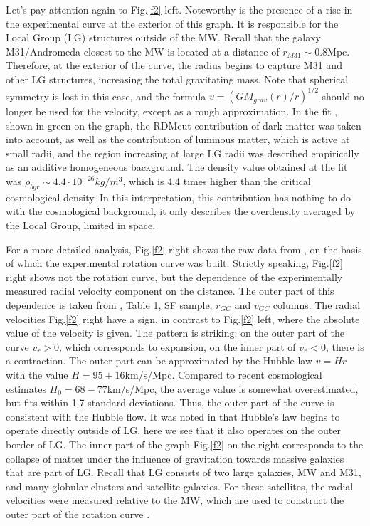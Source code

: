 \documentclass{article}
\begin{document}
Let's pay attention again to Fig.\ref {f2} left. Noteworthy is the presence of a rise in the experimental curve at the exterior of this graph. It is responsible for the Local Group (LG) structures outside of the MW. Recall that the galaxy M31/Andromeda closest to the MW is located at a distance of $ r_ {M31} \sim0.8 $Mpc. Therefore, at the exterior of the curve, the radius begins to capture M31 and other LG structures, increasing the total gravitating mass. Note that spherical symmetry is lost in this case, and the formula $ v = (GM_ {grav} (r) / r) ^ {1/2} $ should no longer be used for the velocity, except as a rough approximation. In the fit \cite {bled2020}, shown in green on the graph, the RDMcut contribution of dark matter was taken into account, as well as the contribution of luminous matter, which is active at small radii, and the region increasing at large LG radii was described empirically as an additive homogeneous background. The density value obtained at the fit was $ \rho_ {bgr} \sim4.4 \cdot10 ^ {- 26} kg / m ^ 3 $, which is 4.4 times higher than the critical cosmological density. In this interpretation, this contribution has nothing to do with the cosmological background, it only describes the overdensity averaged by the Local Group, limited in space.

For a more detailed analysis, Fig.\ref {f2} right shows the raw data from \cite {0811.0860}, on the basis of which the experimental rotation curve \cite {1307.8241} was built. Strictly speaking, Fig.\ref {f2} right shows not the rotation curve, but the dependence of the experimentally measured radial velocity component on the distance. The outer part of this dependence is taken from \cite {0811.0860}, Table 1, SF sample, $ r_ {GC} $ and $ v_ {GC} $ columns. The radial velocities Fig.\ref {f2} right have a sign, in contrast to Fig.\ref {f2} left, where the absolute value of the velocity is given. The pattern is striking: on the outer part of the curve $ v_r> 0 $, which corresponds to expansion, on the inner part of $ v_r <0 $, there is a contraction. The outer part can be approximated by the Hubble law $ v = Hr $ with the value $ H = 95 \pm16 $km/s/Mpc. Compared to recent cosmological estimates $ H_0 = 68-77 $km/s/Mpc, the average value is somewhat overestimated, but fits within 1.7 standard deviations. Thus, the outer part of the curve is consistent with the Hubble flow. It was noted in \cite {astro-ph/9711073} that Hubble's law begins to operate directly outside of LG, here we see that it also operates on the outer border of LG. The inner part of the graph Fig.\ref {f2} on the right corresponds to the collapse of matter under the influence of gravitation towards massive galaxies that are part of LG. Recall that LG consists of two large galaxies, MW and M31, and many globular clusters and satellite galaxies. For these satellites, the radial velocities were measured relative to the MW, which are used to construct the outer part of the rotation curve \cite {1307.8241}.
\end{document}
